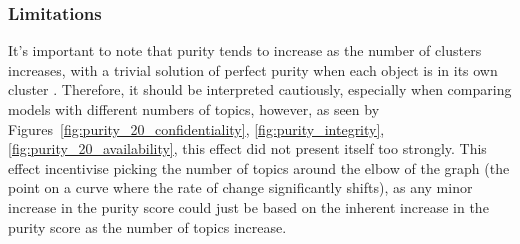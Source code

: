 \documentclass[12pt]{article}
\begin{document}
\begin{figure}[h!]
\end{figure}

\subsubsection*{Limitations}

It's important to note that purity tends to increase as the number of clusters increases, with a
trivial solution of perfect purity when each object is in its own cluster \cite{v-measure}.
Therefore, it should be interpreted cautiously, especially when comparing models with different
numbers of topics, however, as seen by Figures~\ref{fig:purity_20_confidentiality}, \ref{fig:purity_integrity},
\ref{fig:purity_20_availability}, this effect did not present
itself too strongly. This effect incentivise picking the number of topics around the elbow of the
graph (the point on a curve where the rate of change significantly shifts), as any minor increase in
the purity score could just be based on the inherent increase in the purity score as the number of
topics increase.








\end{document}
